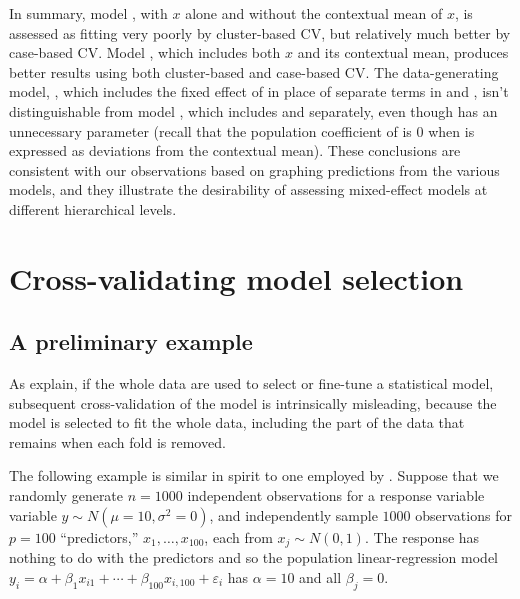 \documentclass[
]{jss}
\begin{document}
In summary, model , with \(x\) alone and without the
contextual mean of \(x\), is assessed as fitting very poorly by
cluster-based CV, but relatively much better by case-based CV. Model
, which includes both \(x\) and its contextual mean,
produces better results using both cluster-based and case-based CV. The
data-generating model, , which includes the fixed effect of
 in place of separate terms in  and ,
isn't distinguishable from model , which includes 
and  separately, even though  has an unnecessary
parameter (recall that the population coefficient of  is 0 when
 is expressed as deviations from the contextual mean). These
conclusions are consistent with our observations based on graphing
predictions from the various models, and they illustrate the
desirability of assessing mixed-effect models at different hierarchical
levels.

\hypertarget{cross-validating-model-selection}{%
\section{Cross-validating model
selection}\label{cross-validating-model-selection}}

\hypertarget{a-preliminary-example}{%
\subsection{A preliminary example}\label{a-preliminary-example}}

As \citet[Sec. 7.10.2: ``The Wrong and Right Way to Do
Cross-validation'']{HastieTibshiraniFriedman:2009} explain, if the whole
data are used to select or fine-tune a statistical model, subsequent
cross-validation of the model is intrinsically misleading, because the
model is selected to fit the whole data, including the part of the data
that remains when each fold is removed.

The following example is similar in spirit to one employed by
\citet{HastieTibshiraniFriedman:2009}. Suppose that we randomly generate
\(n = 1000\) independent observations for a response variable variable
\(y \sim N(\mu = 10, \sigma^2 = 0)\), and independently sample \(1000\)
observations for \(p = 100\) ``predictors,'' \(x_1, \ldots, x_{100}\),
each from \(x_j \sim N(0, 1)\). The response has nothing to do with the
predictors and so the population linear-regression model
\(y_i = \alpha + \beta_1 x_{i1} + \cdots + \beta_{100} x_{i,100} + \varepsilon_i\)
has \(\alpha = 10\) and all \(\beta_j = 0\).
\end{document}
